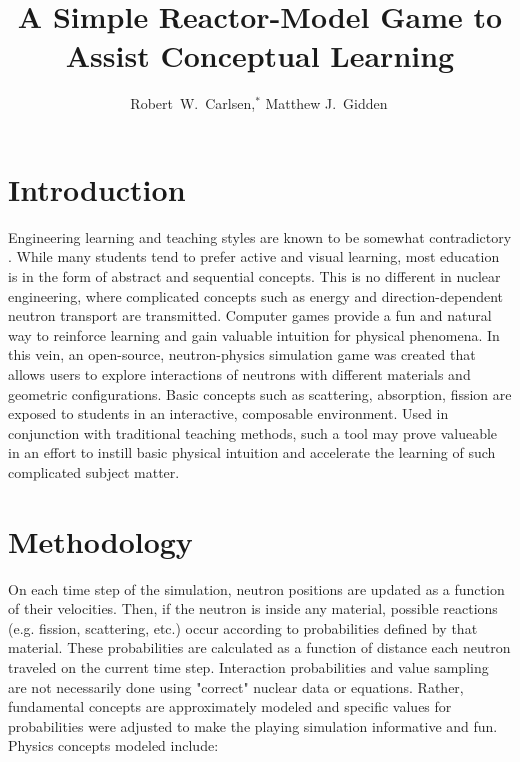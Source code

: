 \documentclass{anstrans}
\title{A Simple Reactor-Model Game to Assist Conceptual Learning}
\author{Robert~W.~Carlsen,$^{*}$ Matthew J.~Gidden$^{\*}$}
\institute{
$^{*}$University of Wisconsin, Nuclear Engineering Dept., 1500 Engineering Dr., Madison, WI
}
\begin{document}
\section{Introduction}

Engineering learning and teaching styles are known to be somewhat contradictory
\cite{felder2000learning}. While many students tend to prefer active and visual
learning, most education is in the form of abstract and sequential
concepts. This is no different in nuclear engineering, where complicated
concepts such as energy and direction-dependent neutron transport are
transmitted. Computer games provide a fun and natural way to reinforce learning
and gain valuable intuition for physical phenomena. In this vein, an open-source,
neutron-physics simulation game was created that allows users to explore
interactions of neutrons with different materials and geometric
configurations. Basic concepts such as scattering, absorption, fission are
exposed to students in an interactive, composable environment. Used in
conjunction with traditional teaching methods, such a tool may prove valueable
in an effort to instill basic physical intuition and accelerate the learning of
such complicated subject matter.

\section{Methodology}

On each time step of the simulation, neutron positions are updated as a
function of their velocities.  Then, if the neutron is inside any material,
possible reactions (e.g. fission, scattering, etc.) occur according to
probabilities defined by that material.  These probabilities are calculated as
a function of distance each neutron traveled on the current time step.
Interaction probabilities and value sampling are not necessarily done using
"correct" nuclear data or equations.  Rather, fundamental concepts are
approximately modeled and specific values for probabilities were adjusted to
make the playing simulation informative and fun.  Physics concepts modeled
include:
\end{document}

